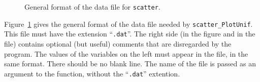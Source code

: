 \begin{figure}
\begin{center}
\end{center}
\caption { General format of the data file for {\tt scatter}.}
\label{formatdon}
\end{figure}


Figure~\ref{formatdon} gives the general format of the data file 
needed by {\tt scatter\_PlotUnif}.
This file must have the extension ``{\tt .dat}''.
The right side (in the figure and in the file) contains optional
(but useful) comments that are disregarded by the program.
The values of the variables on the left must appear in the file,
in the same format.
There should be no blank line.
The name of the file is passed as an argument to the function,
without the ``{\tt .dat}'' extention.


